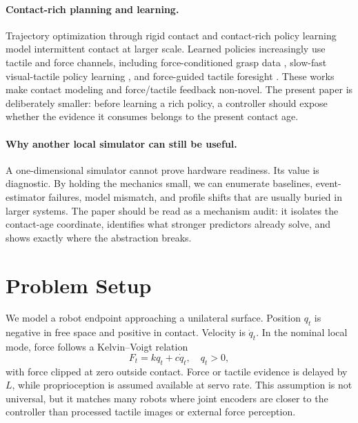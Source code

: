 \documentclass{article}
\newcommand{\lat}{L}
\newcommand{\force}{F}
\newcommand{\qpos}{q}
\newcommand{\qvel}{\dot q}
\begin{document}
\paragraph{Contact-rich planning and learning.}
Trajectory optimization through rigid contact \citep{posa2013direct} and contact-rich policy learning \citep{levine2015learning} model intermittent contact at larger scale. Learned policies increasingly use tactile and force channels, including force-conditioned grasp data \citep{xie2024just}, slow-fast visual-tactile policy learning \citep{xue2025reactive}, and force-guided tactile foresight \citep{zang2026tacforesight}. These works make contact modeling and force/tactile feedback non-novel. The present paper is deliberately smaller: before learning a rich policy, a controller should expose whether the evidence it consumes belongs to the present contact age.

\paragraph{Why another local simulator can still be useful.}
A one-dimensional simulator cannot prove hardware readiness. Its value is diagnostic. By holding the mechanics small, we can enumerate baselines, event-estimator failures, model mismatch, and profile shifts that are usually buried in larger systems. The paper should be read as a mechanism audit: it isolates the contact-age coordinate, identifies what stronger predictors already solve, and shows exactly where the abstraction breaks.

\section{Problem Setup}

We model a robot endpoint approaching a unilateral surface. Position $\qpos_t$ is negative in free space and positive in contact. Velocity is $\qvel_t$. In the nominal local mode, force follows a Kelvin--Voigt relation
\begin{equation}
    \force_t = k \qpos_t + c \qvel_t,
    \quad \qpos_t > 0,
\end{equation}
with force clipped at zero outside contact. Force or tactile evidence is delayed by $\lat$, while proprioception is assumed available at servo rate. This assumption is not universal, but it matches many robots where joint encoders are closer to the controller than processed tactile images or external force perception.
\end{document}
